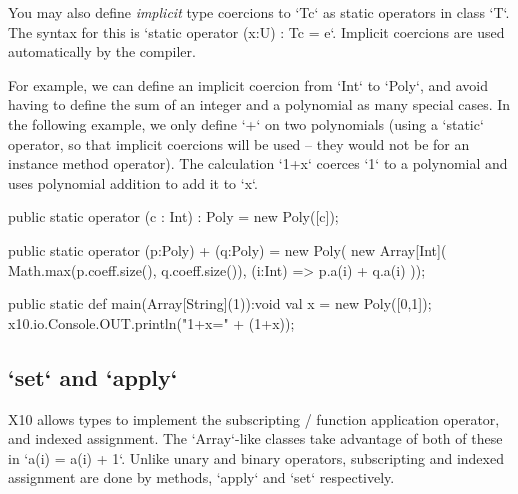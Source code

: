You may also define {\em implicit} type coercions to \xcd`T{c}` as static
operators in class \xcd`T`.  The syntax for this is
\xcd`static operator (x:U) : T{c} = e`.
Implicit coercions are used automatically by the compiler.  

For example, we can define an implicit coercion from \xcd`Int` to \xcd`Poly`,
and avoid having to define the sum of an integer and a polynomial
as many special cases.  In the following example, we only define \xcd`+` on
two polynomials (using a \xcd`static` operator, so that implicit coercions
will be used -- they would not be for an instance method operator).  The
calculation \xcd`1+x` coerces \xcd`1` to a polynomial and uses polynomial
addition to add it to \xcd`x`.


\begin{xten}
  public static operator (c : Int) : Poly = new Poly([c]);

  public static operator (p:Poly) + (q:Poly) = new Poly(
      new Array[Int](
        Math.max(p.coeff.size(), q.coeff.size()),
        (i:Int) => p.a(i) + q.a(i)
     ));

  public static def main(Array[String](1)):void {
     val x = new Poly([0,1]);
     x10.io.Console.OUT.println("1+x=" + (1+x));
  }
\end{xten}


\subsection{\xcd`set` and \xcd`apply`}
\index{()}
\index{()=}
\label{set-and-apply}
X10 allows types to implement the subscripting / function application
operator, and indexed assignment.  The \xcd`Array`-like classes take advantage
of both of these in \xcd`a(i) = a(i) + 1`.  Unlike unary and binary operators,
subscripting and indexed assignment are done by methods, \xcd`apply` and
\xcd`set` respectively.

